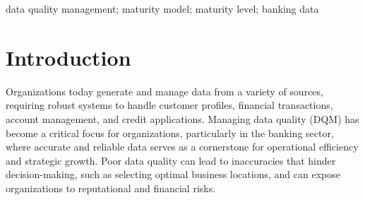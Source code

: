 \documentclass[conference]{IEEEtran}
\begin{document}
\begin{IEEEkeywords}
data quality management; maturity model; maturity level; banking data
\end{IEEEkeywords}

\section{Introduction}




Organizations today generate and manage data from a variety of sources, requiring robust systems to handle customer profiles, financial transactions, account management, and credit applications. Managing data quality (DQM) has become a critical focus for organizations, particularly in the banking sector, where accurate and reliable data serves as a cornerstone for operational efficiency and strategic growth. Poor data quality can lead to inaccuracies that hinder decision-making, such as selecting optimal business locations, and can expose organizations to reputational and financial risks.
\end{document}
